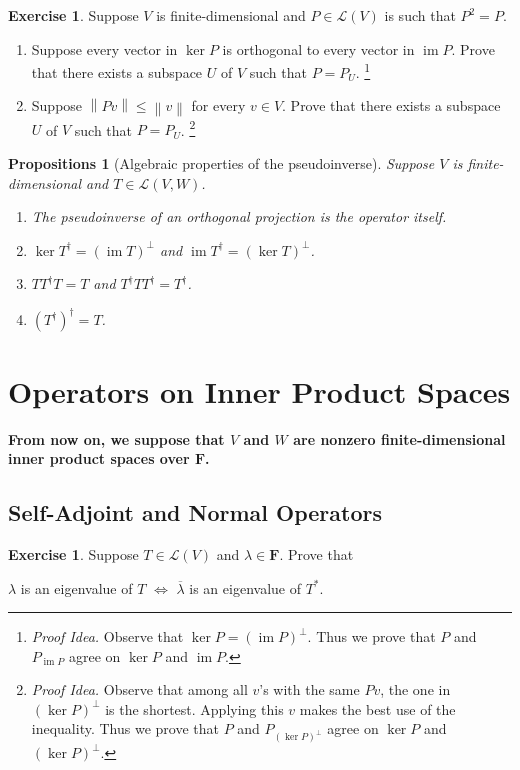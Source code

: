 \documentclass[nofonts,colorlinks]{tufte-handout}
\theoremstyle{plain} %
\newtheorem{props}[thm]{Propositions}
\theoremstyle{definition}
\newtheorem{exer}[thm]{Exercise}
\theoremstyle{remark}
\def\idea{\textit{\color[rgb]{0,0,.55}Proof Idea. }}
\newcommand{\bra}[1]{\mathopen{}\left(#1\right)}
\newcommand{\norm}[1]{\mathopen{}\left\lVert#1\right\rVert}
\newcommand{\F}{\mathbf{F}}
\renewcommand{\L}{\mathcal{L}}
\DeclareMathOperator{\im}{im}
\begin{document}
\begin{exer}
	Suppose $V$ is finite-dimensional and  $P\in\L(V)$ is such that $P^2=P$.
	\begin{enumerate}
		\item Suppose every vector in $\ker P$ is orthogonal to every vector in $\im P$. Prove that there exists a subspace $U$ of $V$ such that $P=P_U$.%
		\footnote{\idea Observe that $\ker P=(\im P)^\perp$. Thus we prove that $P$ and $P_{\im P}$ agree on $\ker P$ and $\im P$.}
		\item Suppose $\norm{Pv}\leq\norm{v}$ for every $v\in V$. Prove that there exists a subspace $U$ of $V$ such that $P=P_U$.%
		\footnote{\idea Observe that among all $v$'s with the same $Pv$, the one in $(\ker P)^\perp$ is the shortest. Applying this $v$ makes the best use of the inequality. Thus we prove that $P$ and $P_{(\ker P)^\perp}$ agree on $\ker P$ and $(\ker P)^\perp$.}
	\end{enumerate}
\end{exer}

\begin{props}[Algebraic properties of the pseudoinverse]
	Suppose $V$ is finite-dimensional and $T\in\L(V,W)$.
	\begin{enumerate}
		\item The pseudoinverse of an orthogonal projection is the operator itself.
		\item $\ker T^\dagger=(\im T)^\perp$ and $\im T^\dagger=(\ker T)^\perp$.
		\item $TT^\dagger T=T$ and $T^\dagger TT^\dagger=T^\dagger$.
		\item $\bra{T^\dagger}^\dagger=T$.
	\end{enumerate}
\end{props}


\section{Operators on Inner Product Spaces}
\textbf{From now on, we suppose that $V$ and $W$ are nonzero finite-dimensional inner product spaces over $\F$.}
\subsection{Self-Adjoint and Normal Operators}
\begin{exer}
	Suppose $T\in\L(V)$ and $\lambda\in\F$. Prove that
	\begin{center}
		$\lambda$ is an eigenvalue of $T$ $\iff$ $\overline{\lambda}$ is an eigenvalue of $T^*$.
	\end{center}
\end{exer}
\end{document}
